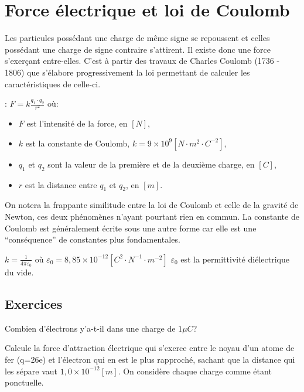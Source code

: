 \chapter{Force électrique et loi de Coulomb}
Les particules possédant une charge de même signe se repoussent et celles possédant une charge de signe contraire s'attirent. Il existe donc une force s'exerçant entre-elles.
C'est à partir des travaux de Charles Coulomb (1736 - 1806) que s'élabore progressivement la loi permettant de calculer les caractéristiques de celle-ci.
\begin{encadre}
     : \(F=k \frac{q_1 \cdot q_2}{r^2}\)
    où:
    \begin{itemize}[label=\textbullet]
        \item \(F\) est l'intensité de la force, en \([N]\),
        \item \(k\) est la constante de Coulomb, \(k=9 \times 10^{9} [N \cdot m^2 \cdot C^{-2}]\),
        \item \(q_1\) et \(q_2\) sont la valeur de la première et de la deuxième charge, en \([C]\),
        \item \(r\) est la distance entre \(q_1\) et \(q_2\), en \([m]\).
    \end{itemize}
\end{encadre}
On notera la frappante similitude entre la loi de Coulomb et celle de la gravité de Newton, ces deux phénomènes n'ayant pourtant rien en commun.
La constante de Coulomb est généralement écrite sous une autre forme car elle est une \enquote{conséquence} de constantes plus fondamentales.
\begin{encadre}
    \(k=\frac{1}{4 \pi \varepsilon_0}\) où \(\varepsilon_0=8,85 \times 10^{-12} [C^2 \cdot N^{-1} \cdot m^{-2}]\)
    \(\varepsilon_0\) est la permittivité diélectrique du vide.
\end{encadre}

\newpage

\section{Exercices}
\begin{exercise}
    Combien d'électrons y'a-t-il dans une charge de \(1 \mu C\)?
\end{exercise}
\begin{solution}

\end{solution}

\begin{exercise}
    Calcule la force d'attraction électrique qui s'exerce entre le noyau d'un atome de fer (q=26e) et l'électron qui en est le plus rapproché, sachant que la distance qui les sépare vaut \(1,0 \times 10^{-12}[m]\). On considère chaque charge comme étant ponctuelle.
\end{exercise}
\begin{solution}
\end{solution}


